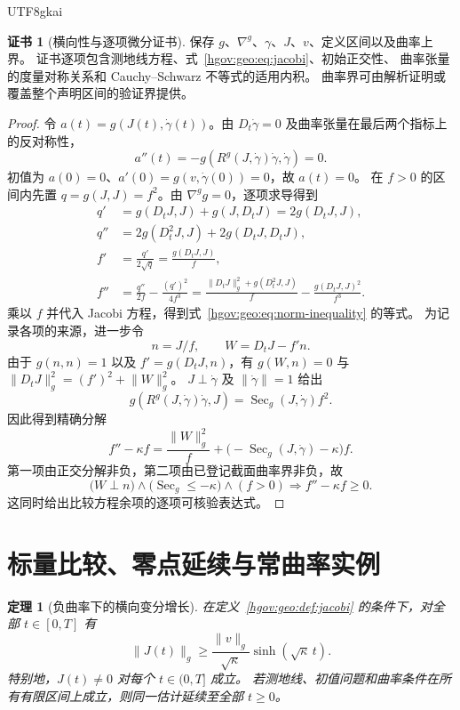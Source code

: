 \documentclass[12pt,a4paper,openany,notitlepage]{report}
\theoremstyle{plain}
\newtheorem{theorem}{定理}[chapter]
\theoremstyle{definition}
\newtheorem*{certificate}{证书}
\theoremstyle{remark}
\begin{document}
\begin{CJK*}{UTF8}{gkai}
\begin{certificate}[横向性与逐项微分证书]
保存 $g$、$\nabla^g$、$\gamma$、$J$、$v$、定义区间以及曲率上界。
证书逐项包含测地线方程、式~\eqref{hgov:geo:eq:jacobi}、初始正交性、
曲率张量的度量对称关系和 Cauchy--Schwarz 不等式的适用内积。
曲率界可由解析证明或覆盖整个声明区间的验证界提供。
\end{certificate}

\begin{proof}
令 $a(t)=g(J(t),\dot\gamma(t))$。由 $D_t\dot\gamma=0$ 及曲率张量在最后两个指标上的反对称性，
\[
a''(t)=-g(R^g(J,\dot\gamma)\dot\gamma,\dot\gamma)=0.
\]
初值为 $a(0)=0$、$a'(0)=g(v,\dot\gamma(0))=0$，故 $a(t)=0$。
在 $f>0$ 的区间内先置 $q=g(J,J)=f^2$。由 $\nabla^g g=0$，逐项求导得到
\[
\begin{aligned}
q'&=g(D_tJ,J)+g(J,D_tJ)=2g(D_tJ,J),\\
q''&=2g(D_t^2J,J)+2g(D_tJ,D_tJ),\\
f'&=\frac{q'}{2\sqrt q}=\frac{g(D_tJ,J)}{f},\\
f''&=\frac{q''}{2f}-\frac{(q')^2}{4f^3}
=\frac{\lVert D_tJ\rVert_g^2+g(D_t^2J,J)}{f}
-\frac{g(D_tJ,J)^2}{f^3}.
\end{aligned}
\]
乘以 $f$ 并代入 Jacobi 方程，得到式~\eqref{hgov:geo:eq:norm-inequality} 的等式。
为记录各项的来源，进一步令
\[
n=J/f,\qquad W=D_tJ-f'n.
\]
由于 $g(n,n)=1$ 以及 $f'=g(D_tJ,n)$，有
$g(W,n)=0$ 与 $\lVert D_tJ\rVert_g^2=(f')^2+\lVert W\rVert_g^2$。
$J\perp\dot\gamma$ 及 $\lVert\dot\gamma\rVert=1$ 给出
\[
g(R^g(J,\dot\gamma)\dot\gamma,J)
=\operatorname{Sec}_g(J,\dot\gamma)f^2.
\]
因此得到精确分解
\begin{equation}
\label{exp:geo:eq:norm-remainder}
f''-\kappa f
=\frac{\lVert W\rVert_g^2}{f}
+\bigl(-\operatorname{Sec}_g(J,\dot\gamma)-\kappa\bigr)f.
\end{equation}
第一项由正交分解非负，第二项由已登记截面曲率界非负，故
\[
\bigl(W\perp n\bigr)\land
\bigl(\operatorname{Sec}_g\le-\kappa\bigr)\land(f>0)
\Longrightarrow f''-\kappa f\ge0.
\]
这同时给出比较方程余项的逐项可核验表达式。
\end{proof}

\section{标量比较、零点延续与常曲率实例}
\label{exp:geo:section:comparison}

\begin{theorem}[负曲率下的横向变分增长]
\label{hgov:geo:thm:growth}
在定义~\ref{hgov:geo:def:jacobi} 的条件下，对全部 $t\in[0,T]$ 有
\begin{equation}
\label{hgov:geo:eq:growth}
\lVert J(t)\rVert_g
\ge\frac{\lVert v\rVert_g}{\sqrt\kappa}
\sinh(\sqrt\kappa\,t).
\end{equation}
特别地，$J(t)\ne0$ 对每个 $t\in(0,T]$ 成立。
若测地线、初值问题和曲率条件在所有有限区间上成立，则同一估计延续至全部 $t\ge0$。
\end{theorem}


\end{CJK*}
\end{document}
